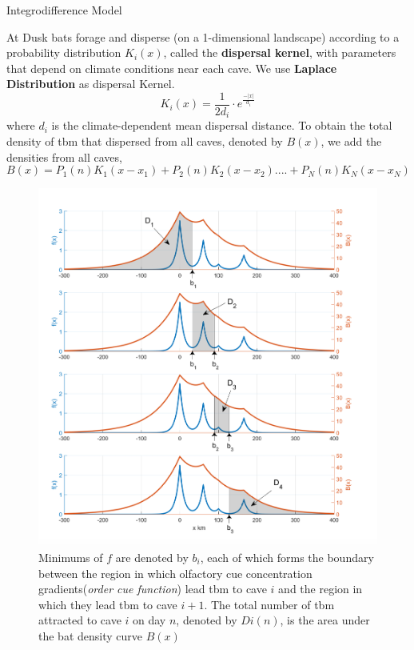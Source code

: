 \documentclass[final]{beamer}
\newlength{\colwidth}
\begin{document}
\begin{frame}[t]
\begin{columns}[t]
\begin{column}{\colwidth}
\begin{block}{Integrodifference Model}
\begin{itemize}
    \end{itemize}
    At Dusk bats forage and disperse (on a 1-dimensional landscape) according to a probability distribution $K_i(x)$, called the \textbf{dispersal kernel}, with parameters that depend on  climate conditions near each cave. We use  \textbf{Laplace Distribution} as dispersal Kernel.
\begin{equation}
    K_i(x) =
\frac{1}{2d_i}\cdot e^{\frac{-|x|}{d_i}}
\end{equation}
where $d_i$ is the climate-dependent mean dispersal distance.
To obtain the total density of tbm that dispersed from all caves, denoted by $B(x)$, we add the densities from all caves,
\begin{equation}
    B(x) = P_1(n)K_1(x-x_1) + P_2(n)K_2(x-x_2) .... + P_N(n)K_N(x-x_N):
\end{equation}
  \begin{figure}
      \includegraphics[width = 13cm]{one-dim.png}
      \caption {Minimums of $f$ are denoted by $b_i$, each of which forms the boundary between the region in which olfactory cue concentration gradients(\textit{order cue function}) lead tbm to cave $i$ and the
region in which they lead tbm to cave $i + 1$. The total number of tbm attracted to cave $i$ on day $n$, denoted by $Di(n)$, is the area under the bat density curve $B(x)$}
    \end{figure}
  \end{block}


\end{column}
\end{columns}
\end{frame}
\end{document}
